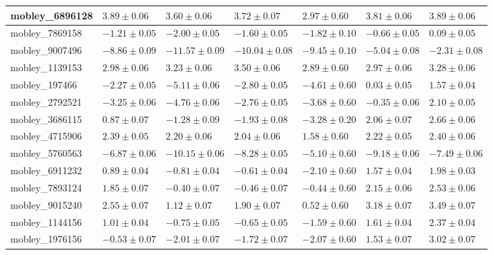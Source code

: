 \documentclass{article}
\begin{document}
\begin{landscape}
\begin{longtable}{|l{3.0cm}|l{3.0cm}|l{3.2cm}|l{3.6cm}|l{3.0cm}|l{3.0cm}|l{3.0cm}|}
mobley\_6896128	&	$	3.89	\pm	0.06	$	&	$	3.60	\pm	0.06	$	&	$	3.72	\pm	0.07	$	&	$	2.97	\pm	0.60	$	&	$	3.81	\pm	0.06	$	&	$	3.89	\pm	0.06	$	\\ \hline
mobley\_7869158	&	$	-1.21	\pm	0.05	$	&	$	-2.00	\pm	0.05	$	&	$	-1.60	\pm	0.05	$	&	$	-1.82	\pm	0.10	$	&	$	-0.66	\pm	0.05	$	&	$	0.09	\pm	0.05	$	\\ \hline
mobley\_9007496	&	$	-8.86	\pm	0.09	$	&	$	-11.57	\pm	0.09	$	&	$	-10.04	\pm	0.08	$	&	$	-9.45	\pm	0.10	$	&	$	-5.04	\pm	0.08	$	&	$	-2.31	\pm	0.08	$	\\ \hline
mobley\_1139153	&	$	2.98	\pm	0.06	$	&	$	3.23	\pm	0.06	$	&	$	3.50	\pm	0.06	$	&	$	2.89	\pm	0.60	$	&	$	2.97	\pm	0.06	$	&	$	3.28	\pm	0.06	$	\\ \hline
mobley\_197466	&	$	-2.27	\pm	0.05	$	&	$	-5.11	\pm	0.06	$	&	$	-2.80	\pm	0.05	$	&	$	-4.61	\pm	0.60	$	&	$	0.03	\pm	0.05	$	&	$	1.57	\pm	0.04	$	\\ \hline
mobley\_2792521	&	$	-3.25	\pm	0.06	$	&	$	-4.76	\pm	0.06	$	&	$	-2.76	\pm	0.05	$	&	$	-3.68	\pm	0.60	$	&	$	-0.35	\pm	0.06	$	&	$	2.10	\pm	0.05	$	\\ \hline
mobley\_3686115	&	$	0.87	\pm	0.07	$	&	$	-1.28	\pm	0.09	$	&	$	-1.93	\pm	0.08	$	&	$	-3.28	\pm	0.20	$	&	$	2.06	\pm	0.07	$	&	$	2.66	\pm	0.06	$	\\ \hline
mobley\_4715906	&	$	2.39	\pm	0.05	$	&	$	2.20	\pm	0.06	$	&	$	2.04	\pm	0.06	$	&	$	1.58	\pm	0.60	$	&	$	2.22	\pm	0.05	$	&	$	2.40	\pm	0.06	$	\\ \hline
mobley\_5760563	&	$	-6.87	\pm	0.06	$	&	$	-10.15	\pm	0.06	$	&	$	-8.28	\pm	0.05	$	&	$	-5.10	\pm	0.60	$	&	$	-9.18	\pm	0.06	$	&	$	-7.49	\pm	0.06	$	\\ \hline
mobley\_6911232	&	$	0.89	\pm	0.04	$	&	$	-0.81	\pm	0.04	$	&	$	-0.61	\pm	0.04	$	&	$	-2.10	\pm	0.60	$	&	$	1.57	\pm	0.04	$	&	$	1.98	\pm	0.03	$	\\ \hline
mobley\_7893124	&	$	1.85	\pm	0.07	$	&	$	-0.40	\pm	0.07	$	&	$	-0.46	\pm	0.07	$	&	$	-0.44	\pm	0.60	$	&	$	2.15	\pm	0.06	$	&	$	2.53	\pm	0.06	$	\\ \hline
mobley\_9015240	&	$	2.55	\pm	0.07	$	&	$	1.12	\pm	0.07	$	&	$	1.90	\pm	0.07	$	&	$	0.52	\pm	0.60	$	&	$	3.18	\pm	0.07	$	&	$	3.49	\pm	0.07	$	\\ \hline
mobley\_1144156	&	$	1.01	\pm	0.04	$	&	$	-0.75	\pm	0.05	$	&	$	-0.65	\pm	0.05	$	&	$	-1.59	\pm	0.60	$	&	$	1.61	\pm	0.04	$	&	$	2.37	\pm	0.04	$	\\ \hline
mobley\_1976156	&	$	-0.53	\pm	0.07	$	&	$	-2.01	\pm	0.07	$	&	$	-1.72	\pm	0.07	$	&	$	-2.07	\pm	0.60	$	&	$	1.53	\pm	0.07	$	&	$	3.02	\pm	0.07	$	\\ \hline

\end{longtable}
\end{landscape}
\end{document}

